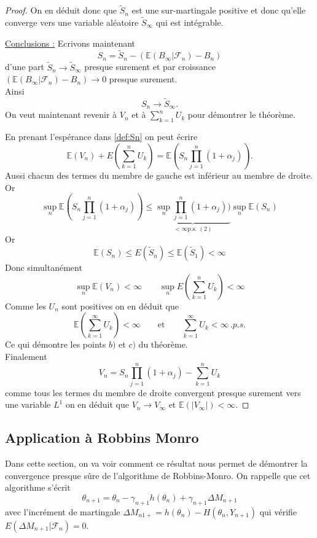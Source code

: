 \documentclass[a4paper,12pt]{book}
\newcommand{\E}{\mathbb{E}}
\newcommand{\Fc}{\mathcal{F}}
\begin{document}
\begin{proof}
On en déduit donc que $\widetilde{S}_n$ est une sur-martingale positive et donc qu'elle converge vers une variable aléatoire $\widetilde{S}_\infty$ qui est intégrable.

\underline{Conclusions :}
Ecrivons maintenant
$$S_n=\widetilde{S}_n  -(\E(B_\infty\lvert\Fc_n) -B_n)$$
d'une part $\widetilde{S}_n\to \widetilde{S}_\infty$ presque surement et par croissance $(\E(B_\infty\lvert\Fc_n) -B_n)\to 0$ presque surement.
\\Ainsi $$S_n\to \widetilde{S}_\infty.$$
On veut maintenant revenir à $V_n$ et à $\sum_{k=1}^n U_k$ pour démontrer le théorème.

En prenant l'espérance dans \eqref{def:Sn} on peut écrire
$$\E(V_n)+ E(\sum_{k=1}^n U_k)=\E(S_n \prod_{j=1}^n(1+\alpha_j)).$$
Aussi chacun des termes du membre de gauche est inférieur au membre de droite. Or
$$\sup_n \E(S_n \prod_{j=1}^n(1+\alpha_j))\le \underbrace{\sup_n \prod_{j=1}^n(1+\alpha_j))}_{<\infty \text{p.s. } (2)} \sup_n \E(S_n)
$$
Or $$\E(S_n)\le E(\widetilde{S}_n)\le \E(\widetilde{S}_1)<\infty$$
Donc simultanément
$$\sup_n\E(V_n)<\infty \qquad \sup_n  E(\sum_{k=1}^n U_k)<\infty$$
Comme les $U_n$ sont positives on en déduit que
$$\E(\sum_{k=1}^\infty U_k)<\infty\qquad \text{et} \qquad \sum_{k=1}^\infty U_k<\infty \,. p.s.$$
Ce qui démontre les points $b)$ et $c)$ du théorème.
\\
Finalement
$$V_n=S_n\prod_{j=1}^n(1+\alpha_j) -\sum_{k=1}^n U_k$$
comme tous les termes du membre de droite convergent presque surement vers une variable $L^1$ on en déduit que $V_n\longrightarrow V_\infty$ et $\E(\lvert V_\infty \lvert)<\infty$.



\end{proof}
\subsection{Application à Robbins Monro}

Dans cette section, on va voir comment ce résultat nous permet de démontrer la convergence presque sûre de l'algorithme de Robbins-Monro. On rappelle que cet algorithme s'écrit
$$\theta_{n+1}=\theta_{n}-\gamma_{n+1}h(\theta_n)+\gamma_{n+1} \Delta M_{n+1}$$ avec l'incrément de martingale
$\Delta M_{n1+}=h(\theta_n)-H(\theta_n,Y_{n+1})$ qui vérifie $E(\Delta M_{n+1}\lvert \Fc_{n}) =0$.
\end{document}
